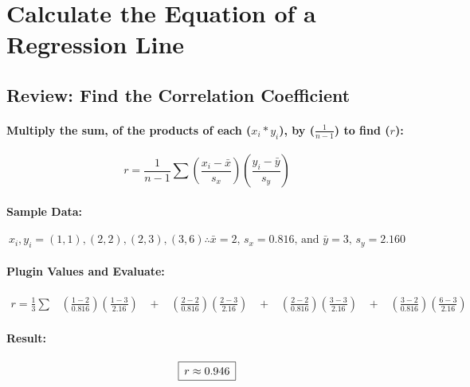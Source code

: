 \documentclass[12pt]{article}
\newcommand{\padBox}[1]{{\setlength\fboxsep{5pt}\boxed{#1}}}
\begin{document}
\section*{Calculate the Equation of a Regression Line}

\subsection{Review: Find the Correlation Coefficient}
\paragraph{Multiply the sum, of the products of each ($x_{i} * y_{i}$), by ($\frac{1}{n-1}$) to find ($r$):}

\begin{equation}
	r = \frac{1}{n - 1}\sum
	\left(\frac{x_{i} - \bar{x}}{s_{x}}\right)
	\left(\frac{y_{i} - \bar{y}}{s_{y}}\right)
\end{equation}%

\paragraph{Sample Data:}
\begin{equation}
	x_{i}, y_{i} = (1, 1), (2, 2), (2, 3), (3, 6) \therefore
	\bar{x} = 2\text{, }s_{x} = 0.816 \text{, and }
	\bar{y} = 3 \text{, }s_{y} = 2.160
\end{equation}

\paragraph{Plugin Values and Evaluate:}

\begin{equation}
\begin{gathered}
		r = \frac{1}{3}\sum \;\;\;%
		\left(\frac{1 - 2}{0.816}\right)\left(\frac{1 - 3}{2.16}\right) \;\;\;%
		+ \;\;\;%
		\left(\frac{2 - 2}{0.816}\right)\left(\frac{2 - 3}{2.16}\right) \;\;\;%
		+ \;\;\;%
		\left(\frac{2 - 2}{0.816}\right)\left(\frac{3 - 3}{2.16}\right) \;\;\;%
		+ \;\;\;%
		\left(\frac{3 - 2}{0.816}\right)\left(\frac{6 - 3}{2.16}\right) \;\;\;%
\end{gathered}%
\end{equation}%

\paragraph{Result:}
\begin{equation}\padBox{r \approx 0.946}\end{equation}
\end{document}
